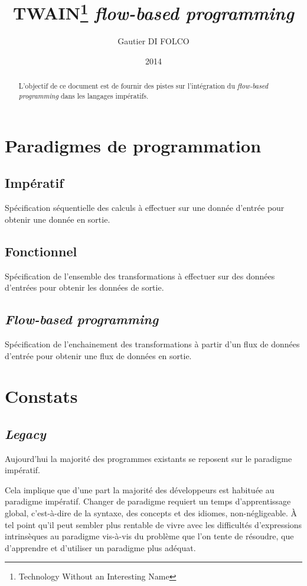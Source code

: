 \documentclass{article}
\title{TWAIN\footnote{Technology Without an Interesting Name} \emph{flow-based programming}}
\author{Gautier DI FOLCO}
\date{2014}
\begin{document}
\maketitle
\tableofcontents

\begin{abstract}
L'objectif de ce document est de fournir des pistes sur l'intégration du
\emph{flow-based programming} dans les langages impératifs.
\end{abstract}

\section{Paradigmes de programmation}
\subsection{Impératif}
Spécification séquentielle des calculs à effectuer sur une donnée d'entrée
pour obtenir une donnée en sortie.

\subsection{Fonctionnel}
Spécification de l'ensemble des transformations à effectuer sur des données
d'entrées pour obtenir les données de sortie.

\subsection{\emph{Flow-based programming}}
Spécification de l'enchainement des transformations à partir d'un flux de données
d'entrée pour obtenir une flux de données en sortie.

\section{Constats}
\subsection{\emph{Legacy}}
Aujourd'hui la majorité des programmes existants se reposent sur le paradigme impératif.

Cela implique que d'une part la majorité des développeurs est habituée au paradigme
impératif.
Changer de paradigme requiert un temps d'apprentissage global, c'est-à-dire de
la syntaxe, des concepts et des idiomes, non-négligeable.
À tel point qu'il peut sembler plus rentable de vivre avec les difficultés
d'expressions intrinsèques au paradigme vis-à-vis du problème que l'on tente de
résoudre, que d'apprendre et d'utiliser un paradigme plus adéquat.
\end{document}
